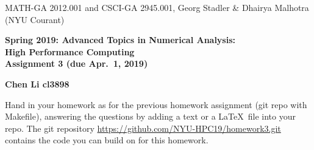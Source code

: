 \documentclass[12pt]{article}
\begin{document}
\begin{center}
  \vspace*{-2cm}
{\small MATH-GA 2012.001 and CSCI-GA 2945.001, Georg Stadler \&
  Dhairya Malhotra (NYU Courant)}
\end{center}
\vspace*{.5cm}
\begin{center}
\large \textbf{%
Spring 2019: Advanced Topics in Numerical Analysis: \\
High Performance Computing \\
Assignment 3 (due Apr.\ 1, 2019) }
\end{center}
\begin{center}
	\textbf{Chen Li cl3898}
\end{center}

 Hand in your homework as for
the previous homework assignment (git repo with Makefile), answering
the questions by adding a text or a \LaTeX\ file into your repo.
The git repository \url{https://github.com/NYU-HPC19/homework3.git}
contains the code you can build on for this homework.
\\[.2ex]
\end{document}
